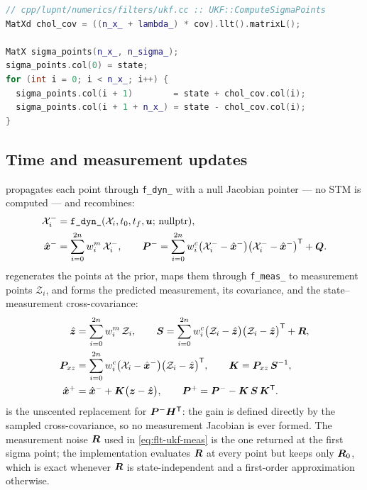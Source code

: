 \begin{lstlisting}[language=cpp, caption={Sigma-point generation.},
                   label={lst:flt-ukf-sigma}]
// cpp/lupnt/numerics/filters/ukf.cc :: UKF::ComputeSigmaPoints
MatXd chol_cov = ((n_x_ + lambda_) * cov).llt().matrixL();

MatX sigma_points(n_x_, n_sigma_);
sigma_points.col(0) = state;
for (int i = 0; i < n_x_; i++) {
  sigma_points.col(i + 1)        = state + chol_cov.col(i);
  sigma_points.col(i + 1 + n_x_) = state - chol_cov.col(i);
}
\end{lstlisting}

\subsection{Time and measurement updates}

 propagates each point through \texttt{f\_dyn\_} with a null
Jacobian pointer --- no STM is computed --- and recombines:
\begin{align}
  \label{eq:flt-ukf-prop}
  \mathcal{X}_i^{-} &= \texttt{f\_dyn\_}(\mathcal{X}_i, t_0, t_f, \bm{u};\, \text{nullptr}), \\
  \label{eq:flt-ukf-predict}
  \hat{\bm{x}}^{-} &= \sum_{i=0}^{2n} w^m_i\,\mathcal{X}_i^{-},
  \qquad
  \bm{P}^{-} = \sum_{i=0}^{2n} w^c_i
      \bigl(\mathcal{X}_i^{-} - \hat{\bm{x}}^{-}\bigr)
      \bigl(\mathcal{X}_i^{-} - \hat{\bm{x}}^{-}\bigr)^{\mathsf{T}} + \bm{Q} .
\end{align}
 regenerates the points at the prior, maps them through
\texttt{f\_meas\_} to measurement points $\mathcal{Z}_i$, and forms the
predicted measurement, its covariance, and the state--measurement
cross-covariance:
\begin{align}
  \label{eq:flt-ukf-meas}
  \hat{\bm{z}} &= \sum_{i=0}^{2n} w^m_i\,\mathcal{Z}_i,
  \qquad
  \bm{S} = \sum_{i=0}^{2n} w^c_i
      \bigl(\mathcal{Z}_i - \hat{\bm{z}}\bigr)
      \bigl(\mathcal{Z}_i - \hat{\bm{z}}\bigr)^{\mathsf{T}} + \bm{R}, \\
  \label{eq:flt-ukf-cross}
  \bm{P}_{xz} &= \sum_{i=0}^{2n} w^c_i
      \bigl(\mathcal{X}_i - \hat{\bm{x}}^{-}\bigr)
      \bigl(\mathcal{Z}_i - \hat{\bm{z}}\bigr)^{\mathsf{T}},
  \qquad
  \bm{K} = \bm{P}_{xz}\,\bm{S}^{-1}, \\
  \label{eq:flt-ukf-update}
  \hat{\bm{x}}^{+} &= \hat{\bm{x}}^{-} + \bm{K}\bigl(\bm{z} - \hat{\bm{z}}\bigr),
  \qquad
  \bm{P}^{+} = \bm{P}^{-} - \bm{K}\,\bm{S}\,\bm{K}^{\mathsf{T}} .
\end{align}
 is the unscented replacement for
$\bm{P}^{-}\bm{H}^{\mathsf{T}}$: the gain is defined directly by the sampled
cross-covariance, so no measurement Jacobian is ever formed. The measurement
noise $\bm{R}$ used in \cref{eq:flt-ukf-meas} is the one returned at the first
sigma point; the implementation evaluates $\bm{R}$ at every point but keeps
only $\bm{R}_0$, which is exact whenever $\bm{R}$ is state-independent and a
first-order approximation otherwise.

